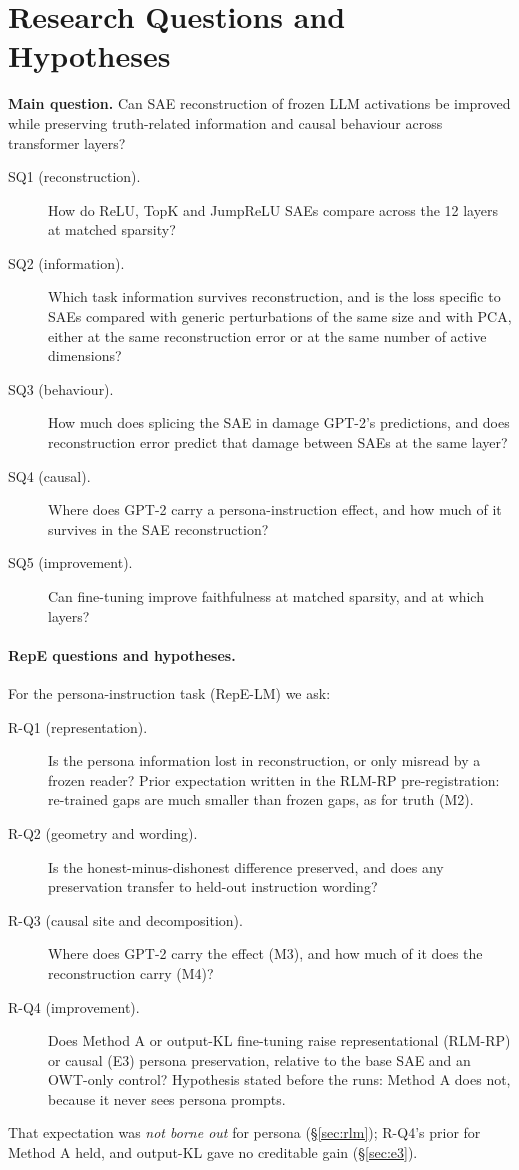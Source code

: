 \section{Research Questions and Hypotheses}\label{sec:questions}

\textbf{Main question.} Can SAE reconstruction of frozen LLM activations be improved while preserving truth-related
information and causal behaviour across transformer layers?

\begin{description}
  \item[SQ1 (reconstruction).] How do ReLU, TopK and JumpReLU SAEs compare across the 12 layers at matched sparsity?
  \item[SQ2 (information).] Which task information survives reconstruction, and is the loss specific to SAEs compared
        with generic perturbations of the same size and with PCA, either at the same reconstruction error or at the
        same number of active dimensions?
  \item[SQ3 (behaviour).] How much does splicing the SAE in damage GPT-2's predictions, and does reconstruction error
        predict that damage between SAEs at the same layer?
  \item[SQ4 (causal).] Where does GPT-2 carry a persona-instruction effect, and how much of it survives in the SAE
        reconstruction?
  \item[SQ5 (improvement).] Can fine-tuning improve faithfulness at matched sparsity, and at which layers?
\end{description}

\paragraph{RepE questions and hypotheses.} For the persona-instruction task (RepE-LM) we ask:
\begin{description}
  \item[R-Q1 (representation).] Is the persona information lost in reconstruction, or only misread by a frozen reader?
        Prior expectation written in the RLM-RP pre-registration: re-trained gaps are much smaller than frozen gaps,
        as for truth (M2).
  \item[R-Q2 (geometry and wording).] Is the honest-minus-dishonest difference preserved, and does any preservation
        transfer to held-out instruction wording?
  \item[R-Q3 (causal site and decomposition).] Where does GPT-2 carry the effect (M3), and how much of it does the
        reconstruction carry (M4)?
  \item[R-Q4 (improvement).] Does Method A or output-KL fine-tuning raise representational (RLM-RP) or causal (E3)
        persona preservation, relative to the base SAE and an OWT-only control? Hypothesis stated before the runs:
        Method A does not, because it never sees persona prompts.
\end{description}
That expectation was \emph{not borne out} for persona (\S\ref{sec:rlm}); R-Q4's prior for Method A held, and output-KL
gave no creditable gain (\S\ref{sec:e3}).

